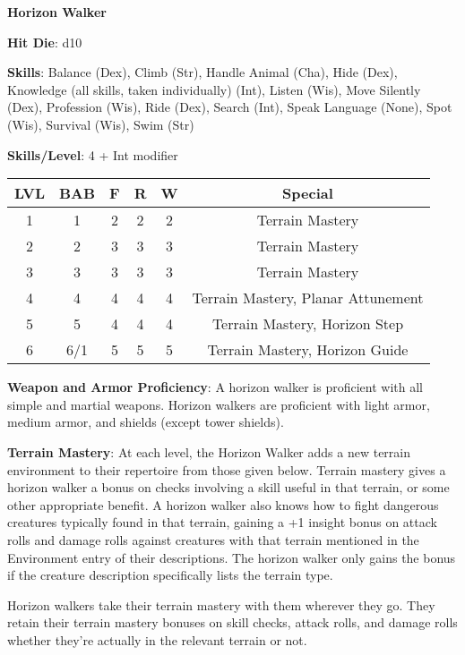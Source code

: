 \textbf{\huge{Horizon Walker}}

\textbf{Hit Die}: d10

\textbf{Skills}: Balance (Dex), Climb (Str), Handle Animal (Cha), Hide (Dex), Knowledge (all skills, taken individually) (Int), Listen (Wis), Move Silently (Dex), Profession (Wis), Ride (Dex), Search (Int), Speak Language (None), Spot (Wis), Survival (Wis), Swim (Str)

\textbf{Skills/Level}: 4 + Int modifier

\begin{center}
\begin{adjustwidth}{-4cm}{}
\begin{small}
\begin{tabular}{| c | c | c | c | c | c |}
\hline
LVL &BAB &F &R &W &Special \\
\hline
1 &1 &2 &2 &2 &Terrain Mastery \\
2 &2 &3 &3 &3 &Terrain Mastery \\
3 &3 &3 &3 &3 &Terrain Mastery \\
4 &4 &4 &4 &4 &Terrain Mastery, Planar Attunement \\
5 &5 &4 &4 &4 &Terrain Mastery, Horizon Step \\
6 &6/1 &5 &5 &5 &Terrain Mastery, Horizon Guide \\
\hline
\end{tabular}
\end{small}
\end{adjustwidth}
\end{center}

\textbf{Weapon and Armor Proficiency}: A horizon walker is proficient with all simple and martial weapons. Horizon walkers are proficient with light armor, medium armor, and shields (except tower shields).

\textbf{Terrain Mastery}: At each level, the Horizon Walker adds a new terrain environment to their repertoire from those given below. Terrain mastery gives a horizon walker a bonus on checks involving a skill useful in that terrain, or some other appropriate benefit. A horizon walker also knows how to fight dangerous creatures typically found in that terrain, gaining a +1 insight bonus on attack rolls and damage rolls against creatures with that terrain mentioned in the Environment entry of their descriptions. The horizon walker only gains the bonus if the creature description specifically lists the terrain type.

Horizon walkers take their terrain mastery with them wherever they go. They retain their terrain mastery bonuses on skill checks, attack rolls, and damage rolls whether they’re actually in the relevant terrain or not.

